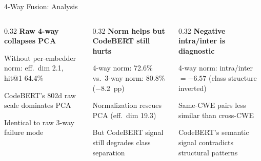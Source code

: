 \documentclass[aspectratio=169,10pt]{beamer}
\begin{document}
\begin{frame}{4-Way Fusion: Analysis}

  \begin{columns}[T]
  \begin{column}{0.32\textwidth}
    {\small\textbf{\textcolor{miss}{Raw 4-way collapses PCA}}}
    \begin{itemize}\setlength{\itemsep}{2pt}
      {\scriptsize
      \item Without per-embedder norm: eff.\ dim 2.1, hit@1 64.4\%
      \item CodeBERT's 802d raw scale dominates PCA
      \item Identical to raw 3-way failure mode}
    \end{itemize}
  \end{column}
  \begin{column}{0.32\textwidth}
    {\small\textbf{\textcolor{warn}{Norm helps but CodeBERT still hurts}}}
    \begin{itemize}\setlength{\itemsep}{2pt}
      {\scriptsize
      \item 4-way norm: 72.6\% vs.\ 3-way norm: 80.8\% ($-$8.2~pp)
      \item Normalization rescues PCA (eff.\ dim 19.3)
      \item But CodeBERT signal still degrades class separation}
    \end{itemize}
  \end{column}
  \begin{column}{0.32\textwidth}
    {\small\textbf{\textcolor{c1}{Negative intra/inter is diagnostic}}}
    \begin{itemize}\setlength{\itemsep}{2pt}
      {\scriptsize
      \item 4-way norm: intra/inter $= -6.57$ (class structure inverted)
      \item Same-CWE pairs less similar than cross-CWE
      \item CodeBERT's semantic signal contradicts structural patterns}
    \end{itemize}
  \end{column}
  \end{columns}

\end{frame}
\end{document}

